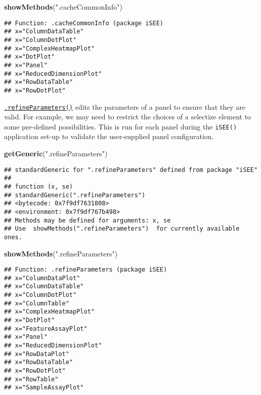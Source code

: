 \documentclass[
]{book}
\newenvironment{Shaded}{\begin{snugshade}}{\end{snugshade}}
\newcommand{\KeywordTok}[1]{\textcolor[rgb]{0.13,0.29,0.53}{\textbf{#1}}}
\newcommand{\NormalTok}[1]{#1}
\newcommand{\StringTok}[1]{\textcolor[rgb]{0.31,0.60,0.02}{#1}}
\begin{document}
\begin{Shaded}
\begin{Highlighting}[]
\KeywordTok{showMethods}\NormalTok{(}\StringTok{".cacheCommonInfo"}\NormalTok{)}
\end{Highlighting}
\end{Shaded}

\begin{verbatim}
## Function: .cacheCommonInfo (package iSEE)
## x="ColumnDataTable"
## x="ColumnDotPlot"
## x="ComplexHeatmapPlot"
## x="DotPlot"
## x="Panel"
## x="ReducedDimensionPlot"
## x="RowDataTable"
## x="RowDotPlot"
\end{verbatim}

\href{https://isee.github.io/iSEE/reference/setup-generics.html}{\texttt{.refineParameters()}} edits the parameters of a panel to ensure that they are valid.
For example, we may need to restrict the choices of a selectize element to some pre-defined possibilities.
This is run for each panel during the \texttt{iSEE()} application set-up to validate the user-supplied panel configuration.

\begin{Shaded}
\begin{Highlighting}[]
\KeywordTok{getGeneric}\NormalTok{(}\StringTok{".refineParameters"}\NormalTok{)}
\end{Highlighting}
\end{Shaded}

\begin{verbatim}
## standardGeneric for ".refineParameters" defined from package "iSEE"
## 
## function (x, se) 
## standardGeneric(".refineParameters")
## <bytecode: 0x7f9df7631808>
## <environment: 0x7f9df767b498>
## Methods may be defined for arguments: x, se
## Use  showMethods(".refineParameters")  for currently available ones.
\end{verbatim}

\begin{Shaded}
\begin{Highlighting}[]
\KeywordTok{showMethods}\NormalTok{(}\StringTok{".refineParameters"}\NormalTok{)}
\end{Highlighting}
\end{Shaded}

\begin{verbatim}
## Function: .refineParameters (package iSEE)
## x="ColumnDataPlot"
## x="ColumnDataTable"
## x="ColumnDotPlot"
## x="ColumnTable"
## x="ComplexHeatmapPlot"
## x="DotPlot"
## x="FeatureAssayPlot"
## x="Panel"
## x="ReducedDimensionPlot"
## x="RowDataPlot"
## x="RowDataTable"
## x="RowDotPlot"
## x="RowTable"
## x="SampleAssayPlot"
\end{verbatim}
\end{document}
